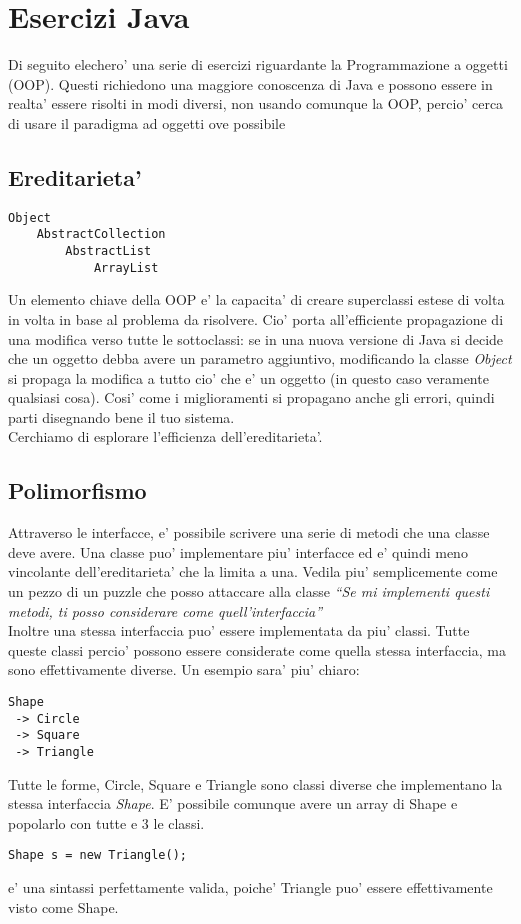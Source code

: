 \documentclass{article}
\begin{document}
\section*{Esercizi Java}
Di seguito elechero' una serie di esercizi riguardante la Programmazione a
oggetti (OOP). Questi richiedono una maggiore conoscenza di Java e
possono essere in realta' essere risolti in modi diversi, non usando comunque la
OOP, percio' cerca di usare il paradigma ad oggetti ove possibile

\subsection*{Ereditarieta'}
\begin{verbatim}
Object
    AbstractCollection
        AbstractList
            ArrayList
\end{verbatim}
Un elemento chiave della OOP e' la capacita' di creare superclassi estese di
volta in volta in base al problema da risolvere. Cio' porta all'efficiente
propagazione di una modifica verso tutte le sottoclassi: se in una nuova
versione di Java si decide che un oggetto debba avere un parametro aggiuntivo,
modificando la classe \textit{Object} si propaga la modifica a tutto cio' che e'
un oggetto (in questo caso veramente qualsiasi cosa). Cosi' come i miglioramenti
si propagano anche gli errori, quindi parti disegnando bene il tuo sistema. \\
Cerchiamo di esplorare l'efficienza dell'ereditarieta'.

\subsection*{Polimorfismo}
Attraverso le interfacce, e' possibile scrivere una serie di metodi che una
classe deve avere. Una classe puo' implementare piu' interfacce ed e' quindi
meno vincolante dell'ereditarieta' che la limita a una. Vedila piu'
semplicemente come un pezzo di un puzzle che posso attaccare alla classe
\textit{``Se mi implementi questi metodi, ti posso considerare come
quell'interfaccia''} \\
Inoltre una stessa interfaccia puo' essere implementata da piu' classi. Tutte
queste classi percio' possono essere considerate come quella stessa interfaccia,
ma sono effettivamente diverse. Un esempio sara' piu' chiaro:
\begin{verbatim}
Shape
 -> Circle
 -> Square
 -> Triangle
\end{verbatim}
Tutte le forme, Circle, Square e Triangle sono classi diverse che implementano
la stessa interfaccia \textit{Shape}. E' possibile comunque avere un array di
Shape e popolarlo con tutte e 3 le classi.
\begin{verbatim}
Shape s = new Triangle();
\end{verbatim}
e' una sintassi perfettamente valida, poiche' Triangle puo' essere
effettivamente visto come Shape.
\end{document}
